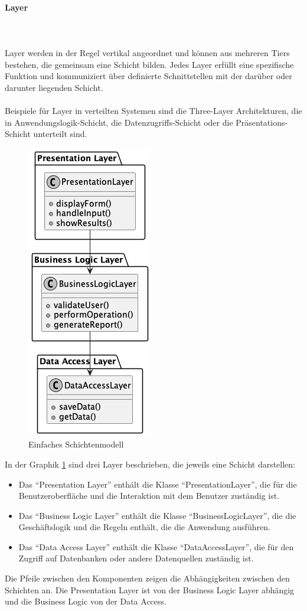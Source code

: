 \documentclass[../vs-script-first-v01.tex]{subfiles}
\begin{document}
\paragraph{Layer}\mbox{}\\
\mbox{}\\
Layer werden in der Regel vertikal angeordnet und können aus mehreren Tiers bestehen, die gemeinsam eine Schicht bilden. Jedes Layer erfüllt eine spezifische Funktion und  kommuniziert über definierte Schnittstellen mit der darüber oder darunter liegenden Schicht. 
\\\\
Beispiele für Layer in verteilten Systemen sind die Three-Layer Architekturen, die in Anwendungslogik-Schicht, die Datenzugriffs-Schicht oder die Präsentations-Schicht unterteilt sind.
\begin{figure}[!h]
  \centering
  \includegraphics[width=0.25 \textwidth]{fig/uml/simple-layers.png}
  \caption{Einfaches Schichtenmodell}
  \label{fig:simple-layer}
\end{figure}

In der Graphik \ref{fig:simple-layer} sind drei Layer beschrieben, die jeweils eine Schicht darstellen:
\begin{itemize}
\item Das \enquote{Presentation Layer} enthält die Klasse \enquote{PresentationLayer}, die für die Benutzeroberfläche und die Interaktion mit dem Benutzer zuständig ist.

\item Das \enquote{Business Logic Layer} enthält die Klasse \enquote{BusinessLogicLayer}, die die Geschäftslogik und die Regeln enthält, die die Anwendung ausführen.

\item Das \enquote{Data Access Layer} enthält die Klasse \enquote{DataAccessLayer}, die für den Zugriff auf Datenbanken oder andere Datenquellen zuständig ist.
\end{itemize}
Die Pfeile zwischen den Komponenten zeigen die Abhängigkeiten zwischen den Schichten an. Die Presentation Layer ist von der Business Logic Layer abhängig und die Business Logic von der Data Access.
\end{document}
